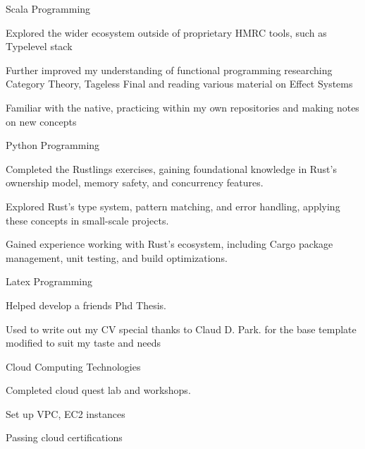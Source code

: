 \begin{cventries}
  \cventry
  {Scala Programming} %
  {} %
  {} %
  {} %
  {
    \begin{cvitems}
      \item {Explored the wider ecosystem outside of proprietary HMRC tools, such as Typelevel stack}
      \item {Further improved my understanding of functional programming researching Category Theory, Tageless Final and reading various material on Effect Systems}
      \item {Familiar with the native, practicing within my own repositories and making notes on new concepts}
    \end{cvitems}
  }
  \cventry
  {Python Programming} %
  {} %
  {} %
  {} %
  {
    \begin{cvitems}
      \item {Completed the Rustlings exercises, gaining foundational knowledge in Rust’s ownership model, memory safety, and concurrency features.}
      \item {Explored Rust’s type system, pattern matching, and error handling, applying these concepts in small-scale projects.}
      \item {Gained experience working with Rust’s ecosystem, including Cargo package management, unit testing, and build optimizations.}
    \end{cvitems}
  }
\cventry
{Latex Programming} %
{} %
{} %
{} %
{
  \begin{cvitems}
    \item {Helped develop a friends Phd Thesis.}
    \item {Used to write out my CV special thanks to Claud D. Park. for the base template modified to suit my taste and needs}
  \end{cvitems}
}

  \cventry
  {Cloud Computing Technologies} %
  {} %
  {} %
  {} %
  {
    \begin{cvitems}
      \item {Completed cloud quest lab and workshops.}
      \item {Set up VPC,  EC2 instances}
      \item {Passing cloud certifications}
    \end{cvitems}
  }

\end{cventries}
